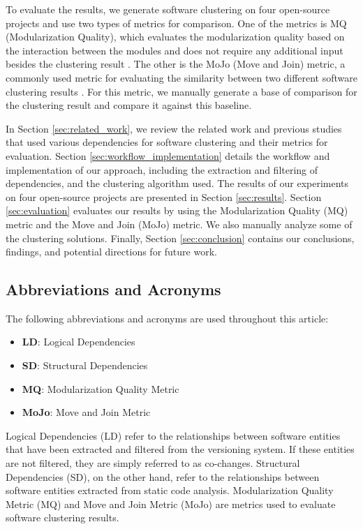 \documentclass{ieeeaccess}
\begin{document}
To evaluate the results, we generate software clustering on four open-source projects and use two types of metrics for comparison. One of the metrics is MQ (Modularization Quality), which evaluates the modularization quality based on the interaction between the modules and does not require any additional input besides the clustering result \cite{b2}. The other is the MoJo (Move and Join) metric, a commonly used metric for evaluating the similarity between two different software clustering results \cite{b3}. For this metric, we manually generate a base of comparison for the clustering result and compare it against this baseline.

In Section \ref{sec:related_work}, we review the related work and previous studies that used various dependencies for software clustering and their metrics for evaluation.
Section \ref{sec:workflow_implementation} details the workflow and implementation of our approach, including the extraction and filtering of dependencies, and the clustering algorithm used.
The results of our experiments on four open-source projects are presented in Section \ref{sec:results}. Section \ref{sec:evaluation} evaluates our results by using the Modularization Quality (MQ) metric and the Move and Join (MoJo) metric. We also manually analyze some of the clustering solutions.
Finally, Section \ref{sec:conclusion} contains our conclusions, findings, and potential directions for future work.

\subsection{Abbreviations and Acronyms}

The following abbreviations and acronyms are used throughout this article:

\begin{itemize}
    \item \textbf{LD}: Logical Dependencies
    \item \textbf{SD}: Structural Dependencies
    \item \textbf{MQ}: Modularization Quality Metric
    \item \textbf{MoJo}: Move and Join Metric
\end{itemize}


Logical Dependencies (LD) refer to the relationships between software entities that have been extracted and filtered from the versioning system. If these entities are not filtered, they are simply referred to as co-changes. 
Structural Dependencies (SD), on the other hand, refer to the relationships between software entities extracted from static code analysis.
Modularization Quality Metric (MQ) and Move and Join Metric (MoJo) are metrics used to evaluate software clustering results.
\end{document}
